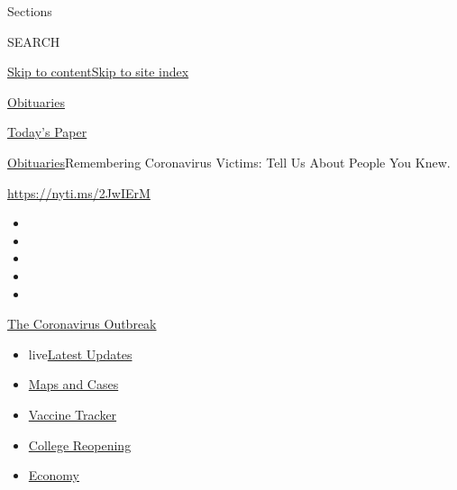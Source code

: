 Sections

SEARCH

\protect\hyperlink{site-content}{Skip to
content}\protect\hyperlink{site-index}{Skip to site index}

\href{https://www.nytimes.com/section/obituaries}{Obituaries}

\href{https://myaccount.nytimes.com/auth/login?response_type=cookie\&client_id=vi}{}

\href{https://www.nytimes.com/section/todayspaper}{Today's Paper}

\href{/section/obituaries}{Obituaries}\textbar{}Remembering Coronavirus
Victims: Tell Us About People You Knew.

\url{https://nyti.ms/2JwIErM}

\begin{itemize}
\item
\item
\item
\item
\item
\end{itemize}

\href{https://www.nytimes.com/news-event/coronavirus?action=click\&pgtype=Article\&state=default\&region=TOP_BANNER\&context=storylines_menu}{The
Coronavirus Outbreak}

\begin{itemize}
\tightlist
\item
  live\href{https://www.nytimes.com/2020/08/04/world/coronavirus-covid-19.html?action=click\&pgtype=Article\&state=default\&region=TOP_BANNER\&context=storylines_menu}{Latest
  Updates}
\item
  \href{https://www.nytimes.com/interactive/2020/us/coronavirus-us-cases.html?action=click\&pgtype=Article\&state=default\&region=TOP_BANNER\&context=storylines_menu}{Maps
  and Cases}
\item
  \href{https://www.nytimes.com/interactive/2020/science/coronavirus-vaccine-tracker.html?action=click\&pgtype=Article\&state=default\&region=TOP_BANNER\&context=storylines_menu}{Vaccine
  Tracker}
\item
  \href{https://www.nytimes.com/2020/08/02/us/covid-college-reopening.html?action=click\&pgtype=Article\&state=default\&region=TOP_BANNER\&context=storylines_menu}{College
  Reopening}
\item
  \href{https://www.nytimes.com/live/2020/08/04/business/stock-market-today-coronavirus?action=click\&pgtype=Article\&state=default\&region=TOP_BANNER\&context=storylines_menu}{Economy}
\end{itemize}

